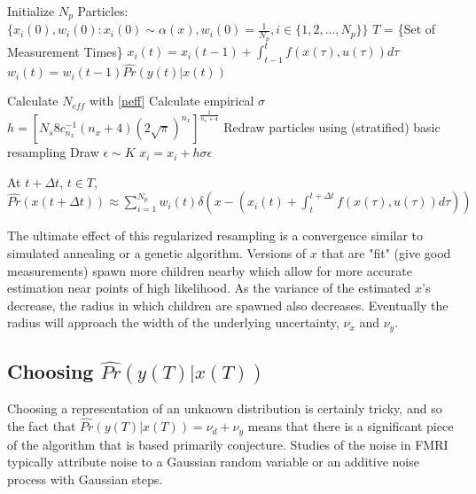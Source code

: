 \documentclass{article}
\begin{document}
 \begin{algorithmic}
\STATE Initialize $N_p$ Particles: 
        $\{x_i(0),w_i(0) : x_i(0) \sim \alpha(x), w_i(0) = \frac{1}{N_p}, i \in \{1, 2, ... , N_p\} \}$
\STATE $T$ = \{Set of Measurement Times\}
        \STATE $x_i(t) = x_i(t-1) + \int_{t-1}^t f(x(\tau), u(\tau)) d\tau $
        \STATE $w_i(t) = w_i(t-1)\hat{Pr}(y(t) | x(t))$
    \ENDFOR

    \STATE Calculate $N_{eff}$ with \eqref{neff}
        \STATE Calculate empirical $\sigma$ 
        \STATE $h = [N_s8c^{-1}_{n_x}(n_x + 4)(2\sqrt{\pi})^{n_x}]^{\frac{1}{n_x +4}}$
        \STATE Redraw particles using (stratified) basic resampling
            \STATE Draw $\epsilon \sim K$
            \STATE $x_i = x_i + h \sigma \epsilon$
        \ENDFOR
    \ENDIF
\ENDFOR

\STATE At $t + \Delta t$, $t \in T$, $\hat{Pr}(x(t+\Delta t)) \approx 
\sum_{i=1}^{N_p} w_i(t)\delta\left(x - (x_i(t) + \int_t^{t+\Delta t} f(x(\tau), u(\tau)) d\tau) \right)$

 \end{algorithmic}

The ultimate effect of this regularized resampling is a convergence similar to simulated annealing
or a genetic algorithm. Versions of $x$ that are "fit" (give good measurements) spawn more children 
nearby which allow for more accurate estimation near points of high likelihood. 
As the variance of the estimated
$x$'s decrease, the radius in which children are spawned also decreases. Eventually the radius
will approach the width of the underlying uncertainty, $\nu_x$ and $\nu_y$.

\subsection{Choosing $\hat{Pr}(y(T) | x(T))$}
Choosing a representation of an unknown distribution is certainly tricky,
and so the fact that $\hat{Pr}(y(T) | x(T)) = \nu_d + \nu_y$ means that
there is a significant piece of the algorithm that is based primarily conjecture.
Studies of the noise in FMRI typically attribute noise to a Gaussian random
variable or an additive noise process with Gaussian steps. 
\end{document}
